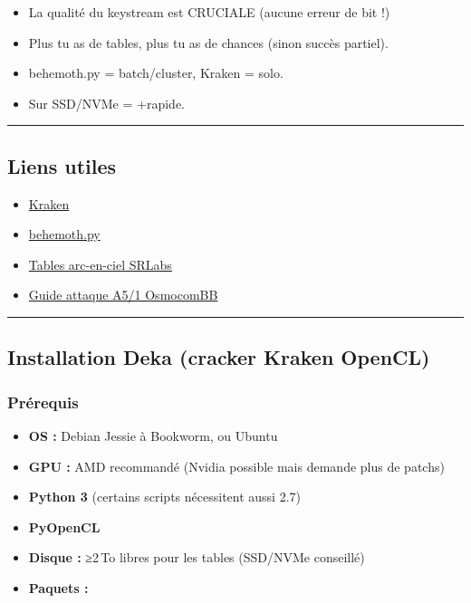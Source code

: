 \documentclass[
  french,
]{article}
\providecommand{\tightlist}{%
  \setlength{\itemsep}{0pt}\setlength{\parskip}{0pt}}
\begin{document}
\begin{itemize}
\tightlist
\item
  La qualité du keystream est CRUCIALE (aucune erreur de bit !)
\item
  Plus tu as de tables, plus tu as de chances (sinon succès partiel).
\item
  behemoth.py = batch/cluster, Kraken = solo.
\item
  Sur SSD/NVMe = +rapide.
\end{itemize}

\begin{center}\rule{0.5\linewidth}{0.5pt}\end{center}

\subsection{Liens utiles}\label{liens-utiles-4}

\begin{itemize}
\tightlist
\item
  \href{https://github.com/JPaulMora/kraken}{Kraken}
\item
  \href{https://github.com/JPaulMora/behemoth}{behemoth.py}
\item
  \href{https://opensource.srlabs.de/projects/a51-decrypt/wiki/Rainbow_Tables}{Tables
  arc-en-ciel SRLabs}
\item
  \href{https://osmocom.org/projects/baseband/wiki/A5_GSM_decryption}{Guide
  attaque A5/1 OsmocomBB}
\end{itemize}

\begin{center}\rule{0.5\linewidth}{0.5pt}\end{center}

\subsection{Installation Deka (cracker Kraken
OpenCL)}\label{installation-deka-cracker-kraken-opencl}

\subsubsection{Prérequis}\label{pruxe9requis-2}

\begin{itemize}
\tightlist
\item
  \textbf{OS :} Debian Jessie à Bookworm, ou Ubuntu
\item
  \textbf{GPU :} AMD recommandé (Nvidia possible mais demande plus de
  patchs)
\item
  \textbf{Python 3} (certains scripts nécessitent aussi 2.7)
\item
  \textbf{PyOpenCL}
\item
  \textbf{Disque :} ≥2\,To libres pour les tables (SSD/NVMe conseillé)
\item
  \textbf{Paquets :}
\end{itemize}
\end{document}
